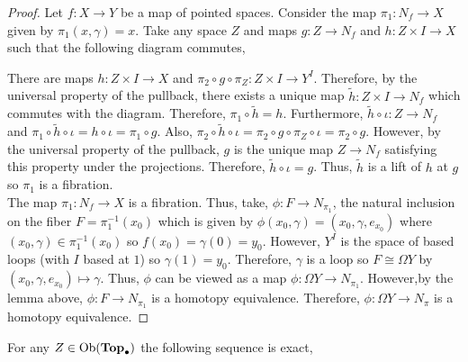 \documentclass[12pt]{extarticle}
\begin{document}
\begin{proof}
Let $f : X \to Y$ be a map of pointed spaces. Consider the map $\pi_1 : N_f \to X$ given by $\pi_1(x, \gamma) = x$. Take any space $Z$ and maps $g : Z \to N_f$ and $h : Z \times I \to X$ such that the following diagram commutes,
\begin{center}
\end{center}
There are maps $h : Z \times I \to X$ and $\pi_2 \circ g \circ \pi_Z : Z \times I \to Y^I$. Therefore, by the universal property of the pullback, there exists a unique map $\tilde{h} : Z \times I \to N_f$ which commutes with the diagram. Therefore, $\pi_1 \circ \tilde{h} = h$. Furthermore, $\tilde{h} \circ \iota : Z \to N_f$ and $\pi_1 \circ \tilde{h} \circ \iota = h \circ \iota = \pi_1 \circ g$. Also, $\pi_2 \circ \tilde{h} \circ \iota = \pi_2 \circ g \circ \pi_Z \circ \iota = \pi_2 \circ g$. However, by the universal property of the pullback, $g$ is the unique map $Z \to N_f$ satisfying this property under the projections. Therefore, $\tilde{h} \circ \iota = g$. Thus, $\tilde{h}$ is a lift of $h$ at $g$ so $\pi_1$ is a fibration. \bigskip \\
The map $\pi_1 : N_f \to X$ is a fibration. Thus, take, $\phi : F \to N_{\pi_1}$, the natural inclusion on the fiber $F = \pi_1^{-1}(x_0)$ which is given by $\phi(x_0, \gamma) = (x_0, \gamma, e_{x_0})$ where $(x_0, \gamma) \in \pi_1^{-1}(x_0)$ so $f(x_0) = \gamma(0) = y_0$. However, $Y^I$ is the space of based loops (with $I$ based at $1$) so $\gamma(1) = y_0$. Therefore, $\gamma$ is a loop so $F \cong \Omega Y$ by $(x_0, \gamma, e_{x_0}) \mapsto \gamma$. Thus, $\phi$ can be viewed as a map $\phi : \Omega Y \to N_{\pi_1}$. However,by the lemma above, $\phi : F \to N_{\pi_1}$ is a homotopy equivalence. Therefore, $\phi : \Omega Y \to N_\pi$ is a homotopy equivalence. 
\end{proof}

\begin{theorem} \label{homexactpuppe}
For any $Z \in \mathrm{Ob}(\mathbf{Top}_{\bullet})$ the following sequence is exact,
\begin{center}
\end{center}  
\end{theorem}
\end{document}

